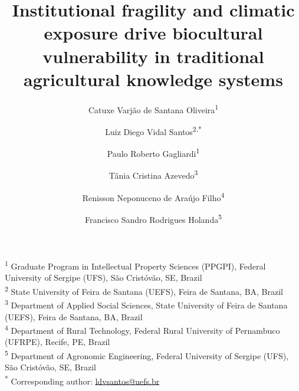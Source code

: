 \documentclass[12pt,a4paper]{article}
\begin{document}
\title{Institutional fragility and climatic exposure drive biocultural vulnerability in traditional agricultural knowledge systems}

\author{Catuxe Varj\~ao de Santana Oliveira\textsuperscript{1} \and Luiz Diego Vidal Santos\textsuperscript{2,*} \and Paulo Roberto Gagliardi\textsuperscript{1} \and T\^ania Cristina Azevedo\textsuperscript{3} \and Renisson Neponuceno de Ara\'ujo Filho\textsuperscript{4} \and Francisco Sandro Rodrigues Holanda\textsuperscript{5}}

\date{}
\maketitle

\noindent\textsuperscript{1} Graduate Program in Intellectual Property Sciences (PPGPI), Federal University of Sergipe (UFS), S\~ao Crist\'ov\~ao, SE, Brazil \\
\textsuperscript{2} State University of Feira de Santana (UEFS), Feira de Santana, BA, Brazil \\
\textsuperscript{3} Department of Applied Social Sciences, State University of Feira de Santana (UEFS), Feira de Santana, BA, Brazil \\
\textsuperscript{4} Department of Rural Technology, Federal Rural University of Pernambuco (UFRPE), Recife, PE, Brazil \\
\textsuperscript{5} Department of Agronomic Engineering, Federal University of Sergipe (UFS), S\~ao Crist\'ov\~ao, SE, Brazil \\
\textsuperscript{*} Corresponding author: \href{mailto:ldvsantos@uefs.br}{ldvsantos@uefs.br}
\end{document}
